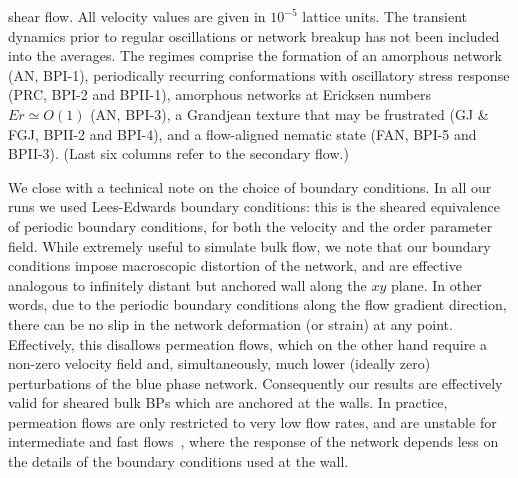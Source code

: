 \documentclass[8.5pt,twoside,twocolumn]{article}
\begin{document}
\begin{table}[htpb]
{{shear flow. All velocity values are given in $10^{-5}$ lattice units. The transient dynamics 
prior to regular oscillations or network breakup has not been included into the averages. 
The regimes comprise the formation of an amorphous network (AN, BPI-1), 
periodically recurring conformations with oscillatory stress response (PRC, BPI-2 and BPII-1), 
amorphous networks at Ericksen numbers ${Er\simeq O(1)}$ (AN, BPI-3), 
a Grandjean texture that may be frustrated (GJ \& FGJ, BPII-2 and BPI-4),
and a flow-aligned nematic state (FAN, BPI-5 and BPII-3).
(Last six columns refer to the secondary flow.)}
}
\label{tab1}
\end{table}

We close with a technical note on the choice of boundary conditions. 
In all our runs we used Lees-Edwards boundary conditions: this
is the sheared equivalence of periodic boundary conditions, for both the 
velocity and the order parameter field. 
While extremely useful to simulate bulk flow, we
note that our boundary conditions impose macroscopic distortion
of the network, and are effective analogous to infinitely distant
but anchored wall along the $xy$ plane. In other words, due to
the periodic boundary conditions along the flow gradient direction, 
there can be no slip in the network deformation (or strain) at any point. 
Effectively, this disallows permeation flows, which on the other
hand require a non-zero velocity field and, simultaneously,
much lower (ideally zero) perturbations of the blue phase network.
Consequently our results are effectively valid for sheared bulk 
BPs which are anchored at the walls. In practice, permeation flows are 
only restricted to very low flow rates, and are unstable for intermediate 
and fast flows~\cite{Dupuis:2005}, 
where the response of the network depends less on
the details of the boundary conditions used at the wall.
\newpage

\footnotesize{
}
\end{document}
